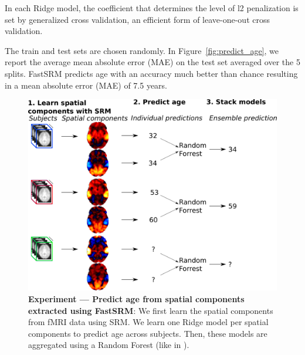 In each Ridge model, the coefficient that determines the level of l2 penalization is set by generalized cross validation, an efficient form of leave-one-out cross validation.

The train and test sets are chosen randomly. In Figure~\ref{fig:predict_age}, we report the average mean absolute error (MAE) on the test set averaged over the 5 splits.
FastSRM predicts age with an accuracy much better than chance resulting in a mean absolute error (MAE) of 7.5 years.

\begin{figure}
\centering
\includegraphics[scale=0.35]{figures/srm/conceptual_figure72.png}
\caption{\textbf{Experiment — Predict age from spatial components extracted using FastSRM}: We first learn the spatial components from fMRI data using SRM. We learn one Ridge model per spatial components to predict age across subjects. Then, these models are aggregated using a Random Forest (like in \cite{rahim2017joint}).} 
\label{fig:experiment_age_prediction}
\end{figure}


